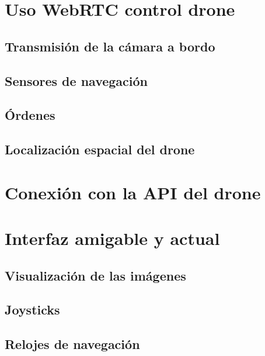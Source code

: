 \section{Uso WebRTC control drone}
\subsection{Transmisión de la cámara a bordo}
\subsection{Sensores de navegación}
\subsection{Órdenes}
\subsection{Localización espacial del drone}

\section{Conexión con la API del drone}

\section{Interfaz amigable y actual}
\subsection{Visualización de las imágenes}
\subsection{Joysticks}
\subsection{Relojes de navegación}